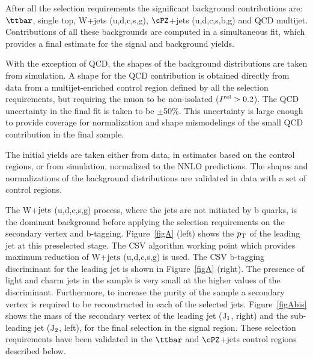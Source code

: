After all the selection requirements the significant background 
contributions are:
$\ttbar$, single top, W+jets (u,d,c,s,g), $\cPZ$+jets (u,d,c,s,b,g) and QCD multijet. 
Contributions of all these backgrounds 
are computed in 
a simultaneous fit, which provides a final estimate for the signal and background yields.

With the exception of QCD, the shapes of the background distributions are taken from simulation. 
A shape for the QCD contribution is obtained directly from  data  from 
a multijet-enriched control region
defined by all the selection requirements, but
requiring the muon to be non-isolated ($I^{\rm{rel}}>0.2$). The QCD uncertainty in the 
final fit is taken to be $\pm$50\%. This uncertainty is large enough to provide coverage for 
normalization and shape mismodelings of the small QCD contribution in the final sample.

The initial yields are taken either from data, in estimates based on the 
control regions, or from simulation, normalized to the NNLO predictions.
The shapes and normalizations of the background distributions
are validated in data with a set of control regions.

The W+$\rm{jets}$ (u,d,c,s,g) process, where the jets are not initiated by b quarks,
is the dominant background before applying the selection requirements on the secondary vertex and
b-tagging. Figure~\ref{figA} (left) shows the $p_\mathrm{T}$ of the leading jet at 
this preselected stage. The CSV algorithm working point which provides maximum reduction of 
W+$\rm{jets}$ (u,d,c,s,g) is used. 
The CSV b-tagging discriminant for the leading jet is shown in Figure~\ref{figA} (right). The presence of light and charm jets
in the sample is very small at the higher values of the discriminant.
Furthermore, to increase the purity of the sample %
a secondary vertex is required to be reconstructed in each of the selected jets.
Figure~\ref{figAbis} shows the mass of the secondary vertex of the leading jet ($\rm{J_{1}}$, right) and the sub-leading jet ($\rm{J_{2}}$, left), for the final selection
in the signal region.
These selection requirements have been validated in the $\ttbar$ and $\cPZ$+jets control regions
described below. 


